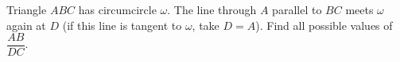Triangle $ABC$ has circumcircle $\omega$. The line through $A$ parallel to $BC$ meets $\omega$ again at $D$ (if this line is tangent to $\omega$, take $D=A$). Find all possible values of $\dfrac{AB}{DC}$.
